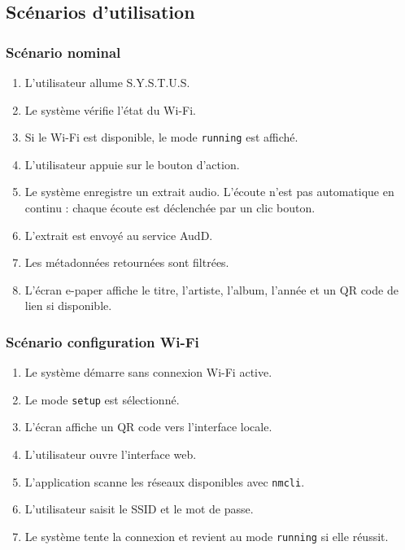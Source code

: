\subsection{Scénarios d'utilisation}

\subsubsection{Scénario nominal}

\begin{enumerate}
    \item L'utilisateur allume S.Y.S.T.U.S.
    \item Le système vérifie l'état du Wi-Fi.
    \item Si le Wi-Fi est disponible, le mode \texttt{running} est affiché.
    \item L'utilisateur appuie sur le bouton d'action.
    \item Le système enregistre un extrait audio. L'écoute n'est pas automatique en continu : chaque écoute est déclenchée par un clic bouton.
    \item L'extrait est envoyé au service AudD.
    \item Les métadonnées retournées sont filtrées.
    \item L'écran e-paper affiche le titre, l'artiste, l'album, l'année et un QR code de lien si disponible.
\end{enumerate}

\subsubsection{Scénario configuration Wi-Fi}

\begin{enumerate}
    \item Le système démarre sans connexion Wi-Fi active.
    \item Le mode \texttt{setup} est sélectionné.
    \item L'écran affiche un QR code vers l'interface locale.
    \item L'utilisateur ouvre l'interface web.
    \item L'application scanne les réseaux disponibles avec \texttt{nmcli}.
    \item L'utilisateur saisit le SSID et le mot de passe.
    \item Le système tente la connexion et revient au mode \texttt{running} si elle réussit.
\end{enumerate}

